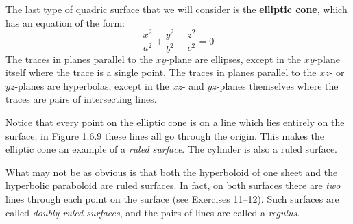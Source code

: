 The last type of quadric surface that we will consider is the \textbf{elliptic cone}, which has
an equation of the form:
\begin{equation}\label{eqn:ellipcone}
 \frac{x^2}{a^2} + \frac{y^2}{b^2} - \frac{z^2}{c^2} = 0
\end{equation}
The traces in planes parallel to the $xy$-plane are ellipses, except in the $xy$-plane itself where the trace is a
single point. The traces in planes parallel to the $xz$- or $yz$-planes are hyperbolas, except in the $xz$- and
$yz$-planes themselves where the traces are pairs of intersecting lines.

Notice that every point on the elliptic cone is on a line which lies entirely on the surface; in Figure 1.6.9 these
lines all go through the origin. This makes the elliptic
cone an example of a \emph{ruled surface}.
The cylinder is also a ruled surface.

What may not be as obvious is that both the hyperboloid of one sheet and the hyperbolic paraboloid are
ruled surfaces. In fact, on both surfaces there are \emph{two} lines through each point on the surface 
(see Exercises 11--12). 
Such surfaces are called \emph{doubly ruled surfaces},
and the pairs of lines are called a \emph{regulus}.

